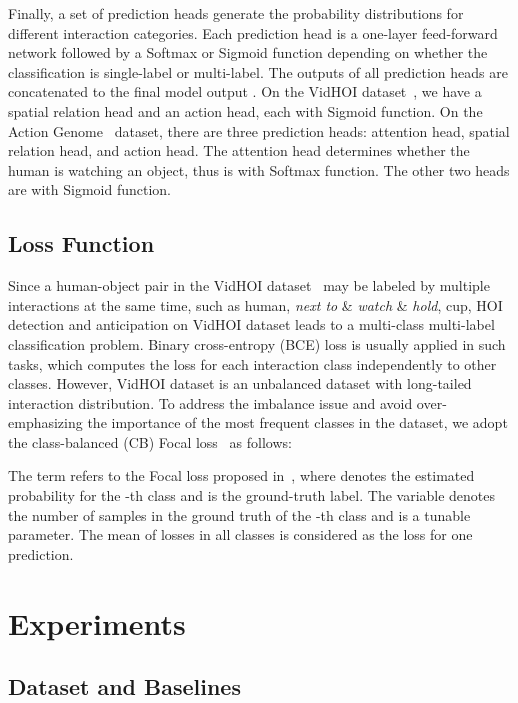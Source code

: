 \documentclass[times,twocolumn,final,authoryear]{elsarticle}
\begin{document}
Finally, a set of prediction heads generate the probability distributions for different interaction categories. Each prediction head is a one-layer feed-forward network followed by a Softmax or Sigmoid function depending on whether the classification is single-label or multi-label. The outputs of all prediction heads are concatenated to the final model output . On the VidHOI dataset~\citep{hoi_v_set:VidHOI}, we have a spatial relation head and an action head, each with Sigmoid function. On the Action Genome~\citep{hoi_v_set:action_genome} dataset, there are three prediction heads: attention head, spatial relation head, and action head. The attention head determines whether the human is watching an object, thus is with Softmax function. The other two heads are with Sigmoid function. 

\subsection{Loss Function}
Since a human-object pair in the VidHOI dataset~\citep{hoi_v_set:VidHOI} may be labeled by multiple interactions at the same time, such as human, \emph{next to} \& \emph{watch} \& \emph{hold}, cup, HOI detection and anticipation on VidHOI dataset leads to a multi-class multi-label classification problem. Binary cross-entropy (BCE) loss is usually applied in such tasks, which computes the loss for each interaction class independently to other classes. However, VidHOI dataset is an unbalanced dataset with long-tailed interaction distribution. To address the imbalance issue and avoid over-emphasizing the importance of the most frequent classes in the dataset, we adopt the class-balanced (CB) Focal loss~\citep{loss:cb} as follows: 

The term  refers to the Focal loss proposed in~\citep{loss:focal}, where  denotes the estimated probability for the -th class and  is the ground-truth label. The variable  denotes the number of samples in the ground truth of the -th class and  is a tunable parameter. The mean of losses in all classes is considered as the loss for one prediction.


\section{Experiments}
\subsection{Dataset and Baselines}
\end{document}

